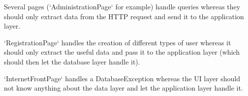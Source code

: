 Several pages (`AdministrationPage` for example) handle queries whereas they should only extract data from the HTTP request and send it to the application layer.

`RegistrationPage` handles the creation of different types of user whereas it should only extract the useful data and pass it to the application layer (which should then let the database layer handle it).

`InternetFrontPage` handles a DatabaseException whereas the UI layer should not know anything about the data layer and let the application layer handle it.


